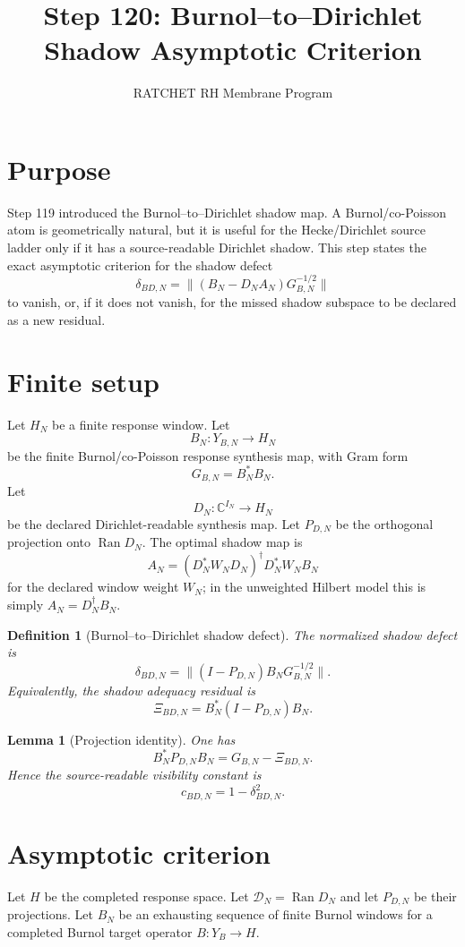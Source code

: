 \documentclass[11pt]{article}
\title{Step 120: Burnol--to--Dirichlet Shadow Asymptotic Criterion}
\author{RATCHET RH Membrane Program}
\date{}
\newtheorem{lemma}{Lemma}
\newtheorem{definition}{Definition}
\begin{document}
\maketitle

\section{Purpose}
Step 119 introduced the Burnol--to--Dirichlet shadow map.  A Burnol/co-Poisson atom is geometrically natural, but it is useful for the Hecke/Dirichlet source ladder only if it has a source-readable Dirichlet shadow.  This step states the exact asymptotic criterion for the shadow defect
\[
\delta_{BD,N}=\|(B_N-D_NA_N)G_{B,N}^{-1/2}\|
\]
to vanish, or, if it does not vanish, for the missed shadow subspace to be declared as a new residual.

\section{Finite setup}
Let $H_N$ be a finite response window.  Let
\[
B_N:Y_{B,N}\to H_N
\]
be the finite Burnol/co-Poisson response synthesis map, with Gram form
\[
G_{B,N}=B_N^*B_N.
\]
Let
\[
D_N:\mathbb C^{I_N}\to H_N
\]
be the declared Dirichlet-readable synthesis map.  Let $P_{D,N}$ be the orthogonal projection onto $\operatorname{Ran}D_N$.  The optimal shadow map is
\[
A_N=(D_N^*W_ND_N)^\dagger D_N^*W_NB_N
\]
for the declared window weight $W_N$; in the unweighted Hilbert model this is simply $A_N=D_N^\dagger B_N$.

\begin{definition}[Burnol--to--Dirichlet shadow defect]
The normalized shadow defect is
\[
\delta_{BD,N}
=
\|(I-P_{D,N})B_NG_{B,N}^{-1/2}\|.
\]
Equivalently, the shadow adequacy residual is
\[
\Xi_{BD,N}=B_N^*(I-P_{D,N})B_N.
\]
\end{definition}

\begin{lemma}[Projection identity]
One has
\[
B_N^*P_{D,N}B_N
=G_{B,N}-\Xi_{BD,N}.
\]
Hence the source-readable visibility constant is
\[
c_{BD,N}=1-\delta_{BD,N}^2.
\]
\end{lemma}

\section{Asymptotic criterion}
Let $H$ be the completed response space.  Let $\mathcal D_N=\operatorname{Ran}D_N$ and let $P_{D,N}$ be their projections.  Let $B_N$ be an exhausting sequence of finite Burnol windows for a completed Burnol target operator $B:Y_B\to H$.
\end{document}
